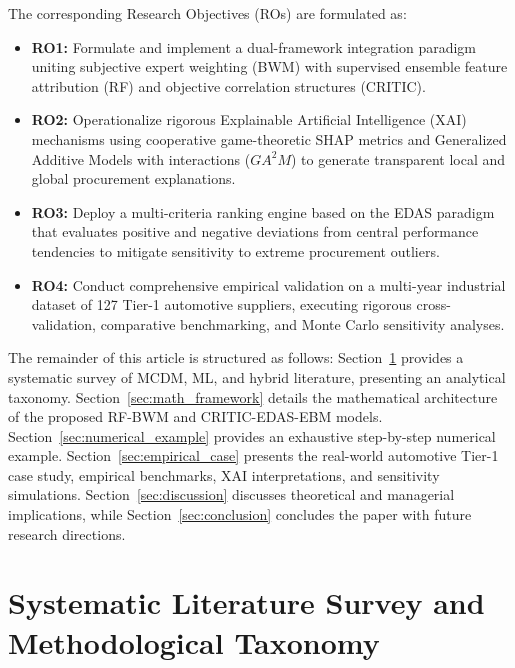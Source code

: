 \documentclass[twocolumn,10pt]{article}
\begin{document}
The corresponding Research Objectives (ROs) are formulated as:
\begin{itemize}
    \item \textbf{RO1:} Formulate and implement a dual-framework integration paradigm uniting subjective expert weighting (BWM) with supervised ensemble feature attribution (RF) and objective correlation structures (CRITIC).
    \item \textbf{RO2:} Operationalize rigorous Explainable Artificial Intelligence (XAI) mechanisms using cooperative game-theoretic SHAP metrics and Generalized Additive Models with interactions ($GA^2M$) to generate transparent local and global procurement explanations.
    \item \textbf{RO3:} Deploy a multi-criteria ranking engine based on the EDAS paradigm that evaluates positive and negative deviations from central performance tendencies to mitigate sensitivity to extreme procurement outliers.
    \item \textbf{RO4:} Conduct comprehensive empirical validation on a multi-year industrial dataset of 127 Tier-1 automotive suppliers, executing rigorous cross-validation, comparative benchmarking, and Monte Carlo sensitivity analyses.
\end{itemize}

The remainder of this article is structured as follows: Section~\ref{sec:lit_review} provides a systematic survey of MCDM, ML, and hybrid literature, presenting an analytical taxonomy. Section~\ref{sec:math_framework} details the mathematical architecture of the proposed RF-BWM and CRITIC-EDAS-EBM models. Section~\ref{sec:numerical_example} provides an exhaustive step-by-step numerical example. Section~\ref{sec:empirical_case} presents the real-world automotive Tier-1 case study, empirical benchmarks, XAI interpretations, and sensitivity simulations. Section~\ref{sec:discussion} discusses theoretical and managerial implications, while Section~\ref{sec:conclusion} concludes the paper with future research directions.

\section{Systematic Literature Survey and Methodological Taxonomy}
\label{sec:lit_review}
\end{document}
